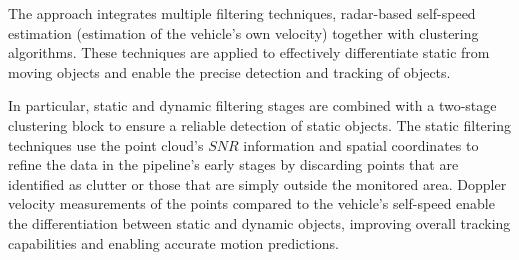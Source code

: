 The approach integrates multiple filtering techniques, radar-based self-speed estimation (estimation of the vehicle's own velocity) together with clustering algorithms. These techniques are applied to effectively differentiate static from moving objects and enable the precise detection and tracking of objects.

In particular, static and dynamic filtering stages are combined with a two-stage clustering block to ensure a reliable detection of static objects.
The static filtering techniques use the point cloud's  $SNR$ information and spatial coordinates to refine the data in the pipeline's early stages by discarding points that are identified as clutter or those that are simply outside the monitored area.
Doppler velocity measurements of the points compared to the vehicle's self-speed enable the differentiation between static and dynamic objects, improving overall tracking capabilities and enabling accurate motion predictions.





